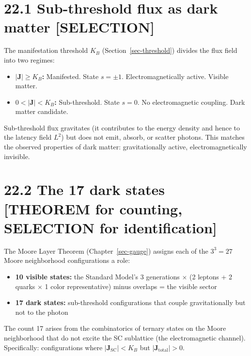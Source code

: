 \documentclass[
  11pt,
  letterpaper,
  twoside,
  openright]{book}
\providecommand{\tightlist}{%
  \setlength{\itemsep}{0pt}\setlength{\parskip}{0pt}}
\begin{document}
\section{22.1 Sub-threshold flux as dark matter
{[}SELECTION{]}}\label{sub-threshold-flux-as-dark-matter-selection}

The manifestation threshold \(K_B\) (Section~\ref{sec-threshold})
divides the flux field into two regimes:

\begin{itemize}
\tightlist
\item
  \textbf{\(|\mathbf{J}| \geq K_B\):} Manifested. State \(s = \pm 1\).
  Electromagnetically active. Visible matter.
\item
  \textbf{\(0 < |\mathbf{J}| < K_B\):} Sub-threshold. State \(s = 0\).
  No electromagnetic coupling. Dark matter candidate.
\end{itemize}

Sub-threshold flux gravitates (it contributes to the energy density and
hence to the latency field \(L^2\)) but does not emit, absorb, or
scatter photons. This matches the observed properties of dark matter:
gravitationally active, electromagnetically invisible.

\section{22.2 The 17 dark states {[}THEOREM for counting, SELECTION for
identification{]}}\label{the-17-dark-states-theorem-for-counting-selection-for-identification}

The Moore Layer Theorem (Chapter~\ref{sec-gauge}) assigns each of the
\(3^3 = 27\) Moore neighborhood configurations a role:

\begin{itemize}
\tightlist
\item
  \textbf{10 visible states:} the Standard Model's 3 generations
  \(\times\) (2 leptons + 2 quarks \(\times\) 1 color representative)
  minus overlaps = the visible sector
\item
  \textbf{17 dark states:} sub-threshold configurations that couple
  gravitationally but not to the photon
\end{itemize}

The count 17 arises from the combinatorics of ternary states on the
Moore neighborhood that do not excite the SC sublattice (the
electromagnetic channel). Specifically: configurations where
\(|\mathbf{J}_\text{SC}| < K_B\) but \(|\mathbf{J}_\text{total}| > 0\).
\end{document}
